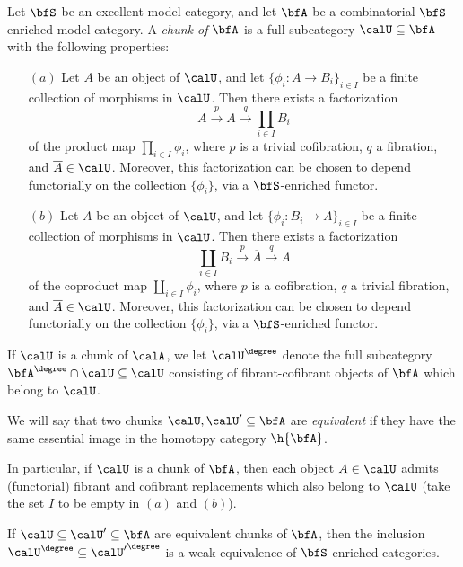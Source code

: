 \begin{definition}\label{defchunk}
Let $\bfS$ be an excellent model category, and let $\bfA$ be a
combinatorial $\bfS$-enriched model category. A {\it chunk of $\bfA$}
is a full subcategory $\calU \subseteq \bfA$ with the following properties:
\begin{itemize}
\item[$(a)$] Let $A$ be an object of $\calU$, and let $\{ \phi_i: A \rightarrow B_i \}_{i \in I}$ be a finite
collection of morphisms in $\calU$. Then there exists a factorization
$$ A \stackrel{p}{\rightarrow} \overline{A} \stackrel{q}{\rightarrow} \prod_{i \in I} B_i$$
of the product map $\prod_{i \in I} \phi_i$,
where $p$ is a trivial cofibration, $q$ a fibration, and $\overline{A} \in \calU$.
Moreover, this factorization can be chosen to depend functorially on the collection
$\{ \phi_i \}$, via a $\bfS$-enriched functor.

\item[$(b)$] Let $A$ be an object of $\calU$, and let $\{ \phi_i: B_i \rightarrow A \}_{i \in I}$ be a finite
collection of morphisms in $\calU$. Then there exists a factorization
$$ \coprod_{i \in I} B_i \stackrel{p}{\rightarrow} \overline{A} \stackrel{q}{\rightarrow} A$$
of the coproduct map $\coprod_{i \in I} \phi_i$,
where $p$ is a cofibration, $q$ a trivial fibration, and $\overline{A} \in \calU$.
Moreover, this factorization can be chosen to depend functorially on the collection
$\{ \phi_i \}$, via a $\bfS$-enriched functor.
\end{itemize}

If $\calU$ is a chunk of $\calA$, we let $\calU^{\degree}$
denote the full subcategory $\bfA^{\degree} \cap \calU \subseteq \calU$ consisting
of fibrant-cofibrant objects of $\bfA$ which belong to $\calU$.

We will say that two chunks $\calU, \calU' \subseteq \bfA$ are {\it equivalent} if
they have the same essential image in the homotopy category $\h{\bfA}$.
\end{definition}

\begin{remark}
In particular, if $\calU$ is a chunk of $\bfA$, then each object $A \in \calU$ admits (functorial)
fibrant and cofibrant replacements which also belong to $\calU$ (take the set $I$ to be empty in
$(a)$ and $(b)$). 
\end{remark}

\begin{remark}
If $\calU \subseteq \calU' \subseteq \bfA$ are equivalent chunks of $\bfA$, then
the inclusion $\calU^{\degree} \subseteq {\calU'}^{\degree}$ is a weak equivalence
of $\bfS$-enriched categories.
\end{remark}

